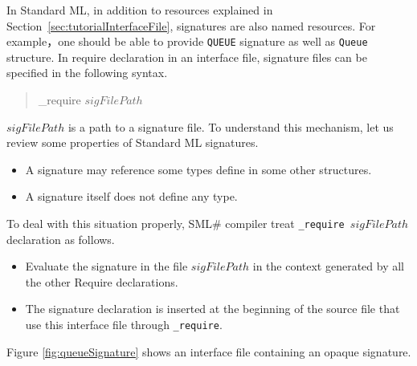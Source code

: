 \documentclass{jbook}
\newcommand{\smlsharp}{SML\#}
\newenvironment{program}{\begin{tt}\begin{quote}}{\end{quote}\end{tt}}
\begin{document}
\else%
	In Standard ML,  in addition to resources explained in
Section~\ref{sec:tutorialInterfaceFile}, signatures are also named
resources.
	For example，one should be able to provide {\tt QUEUE} signature
as well as {\tt Queue} structure.
	In require declaration in an interface file, signature files can
be specified in the following syntax. 
\begin{program}
\_require $sigFilePath$
\end{program}
	$sigFilePath$ is a path to a signature file.
	To understand this mechanism, let us review some properties of
Standard ML signatures.
\begin{itemize}
\item A  signature may reference some types define in some other
structures.
\item A signature itself does not define any type.
\end{itemize}
	To deal with this situation properly, \smlsharp{} compiler 
treat {\tt \_require $sigFilePath$} declaration as follows.
\begin{itemize}
\item 
	Evaluate the signature in the file $sigFilePath$
in the context generated by all the other Require declarations.
\item 
	The signature declaration is inserted at the beginning of the
source file that use this interface file through {\tt \_require}.
\end{itemize}
	Figure \ref{fig:queueSignature} shows an interface file
containing  an opaque signature.
\end{document}
